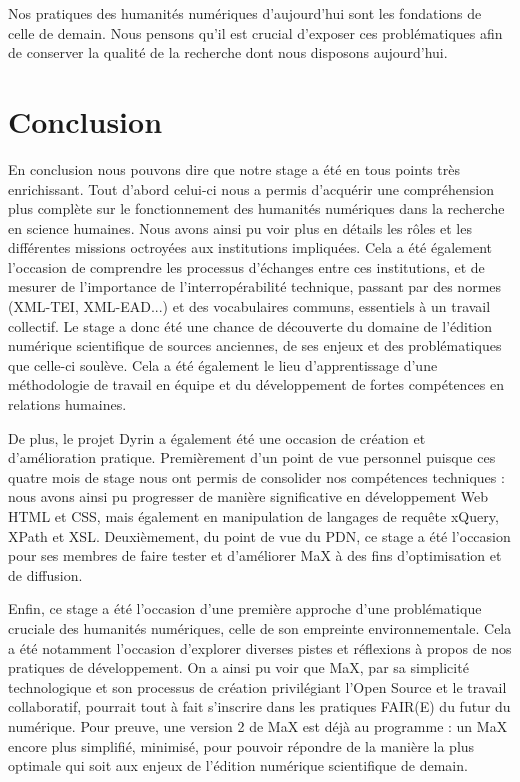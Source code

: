 \documentclass[a4paper,12pt,twoside]{book}
\begin{document}
Nos pratiques des humanités numériques d'aujourd'hui sont les fondations de celle de demain. Nous pensons qu'il est crucial d'exposer ces problématiques afin de conserver la qualité de la recherche dont nous disposons aujourd'hui.

\clearpage

\chapter*{Conclusion}

En conclusion nous pouvons dire que notre stage a été en tous points très enrichissant. Tout d'abord celui-ci nous a permis d'acquérir une compréhension plus complète sur le fonctionnement des humanités numériques dans la recherche en science humaines. Nous avons ainsi pu voir plus en détails les rôles et les différentes missions octroyées aux institutions impliquées. Cela a été également l'occasion de comprendre les processus d'échanges entre ces institutions, et de mesurer de l'importance de l'interropérabilité technique, passant par des normes (XML-TEI, XML-EAD...) et des vocabulaires communs, essentiels à un travail collectif. Le stage a donc été une chance de découverte du domaine de l'édition numérique scientifique de sources anciennes, de ses enjeux et des problématiques que celle-ci soulève. Cela a été également le lieu d'apprentissage d'une méthodologie de travail en équipe et du développement de fortes compétences en relations humaines.


De plus, le projet Dyrin a également été une occasion de création et d'amélioration pratique. Premièrement d'un point de vue personnel puisque ces quatre mois de stage nous ont permis de consolider nos compétences techniques : nous avons ainsi pu progresser de manière significative en développement Web HTML et CSS, mais également en manipulation de langages de requête xQuery, XPath et XSL. Deuxièmement, du point de vue du \acrshort{PDN}, ce stage a été l'occasion pour ses membres de faire tester et d'améliorer MaX à des fins d'optimisation et de diffusion.

Enfin, ce stage a été l'occasion d'une première approche d'une problématique cruciale des humanités numériques, celle de son empreinte environnementale. Cela a été notamment l'occasion d'explorer diverses pistes et réflexions à propos de nos pratiques de développement. On a ainsi pu voir que MaX, par sa simplicité technologique et son processus de création privilégiant l'Open Source et le travail collaboratif, pourrait tout à fait s'inscrire dans les pratiques FAIR(E) du futur du numérique. Pour preuve, une version 2 de MaX est déjà au programme : un MaX encore plus simplifié, minimisé, pour pouvoir répondre de la manière la plus optimale qui soit aux enjeux de l'édition numérique scientifique de demain.


\printglossary[type=\acronymtype]

\listoffigures

\listoftables

\tableofcontents
\end{document}
